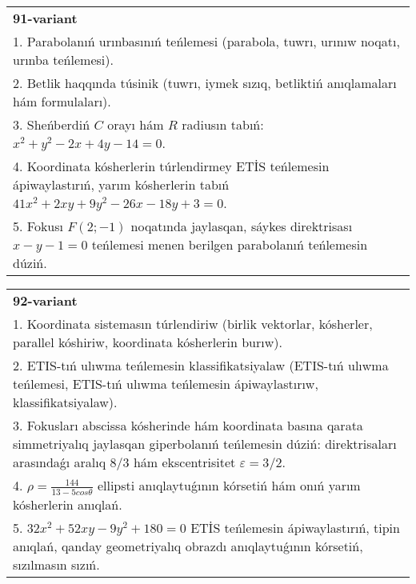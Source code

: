 \documentclass{article}
\begin{document}
\begin{tabular}{m{17cm}}
\textbf{91-variant}\\
1. Parabolanıń urınbasınıń teńlemesi (parabola, tuwrı, urınıw noqatı, urınba teńlemesi).\\

2. Betlik haqqında túsinik (tuwrı, iymek sızıq, betliktiń anıqlamaları hám formulaları).\\

3. Sheńberdiń $C$ orayı hám $R$ radiusın tabıń: $x^2+y^2-2 x+4 y-14=0$.\\

4. Koordinata kósherlerin túrlendirmey ETİS teńlemesin ápiwaylastırıń, yarım kósherlerin tabıń $41x^{2} + 2xy + 9y^{2} - 26x - 18y + 3 = 0$.  \\

5. Fokusı $F(2; - 1)$ noqatında jaylasqan, sáykes direktrisası $x - y - 1 = 0$ teńlemesi menen berilgen parabolanıń teńlemesin dúziń.  
\end{tabular}
\vspace{1cm}


\begin{tabular}{m{17cm}}
\textbf{92-variant}\\
1. Koordinata sistemasın túrlendiriw (birlik vektorlar, kósherler, parallel kóshiriw, koordinata kósherlerin burıw).\\

2. ETIS-tıń ulıwma teńlemesin klassifikatsiyalaw (ETIS-tıń ulıwma teńlemesi, ETIS-tıń ulıwma teńlemesin ápiwaylastırıw, klassifikatsiyalaw).\\

3. Fokusları abscissa kósherinde hám koordinata basına qarata simmetriyalıq jaylasqan giperbolanıń teńlemesin dúziń: direktrisaları arasındaǵı aralıq $8/3$ hám ekscentrisitet $\varepsilon=3/2$.\\

4. $\rho = \frac{144}{13 - 5cos\theta}$ ellipsti anıqlaytuǵının kórsetiń hám onıń yarım kósherlerin anıqlań.\\

5. $32x^{2} + 52xy - 9y^{2} + 180 = 0$ ETİS teńlemesin ápiwaylastırıń, tipin anıqlań, qanday geometriyalıq obrazdı anıqlaytuǵının kórsetiń, sızılmasın sızıń.  
\end{tabular}
\vspace{1cm}
\end{document}
